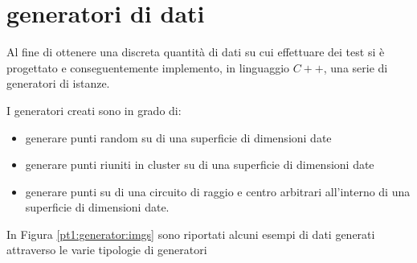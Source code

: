 %
%
\section[Generatori di dati]{generatori di dati}
\label{pt1:generator}
Al fine di ottenere una discreta quantità di dati su cui effettuare dei test si è progettato e conseguentemente implemento, in linguaggio $C++$,
una serie di generatori di istanze.

I generatori creati sono in grado di:

\begin{itemize}
\item generare punti random su di una superficie di dimensioni date
\item generare punti riuniti in cluster su di una superficie di dimensioni date
\item generare punti su di una circuito di raggio e centro arbitrari all'interno di una superficie di dimensioni date.
\end{itemize}

In Figura \ref{pt1:generator:imgs} sono riportati alcuni esempi di dati generati attraverso le varie tipologie di generatori

